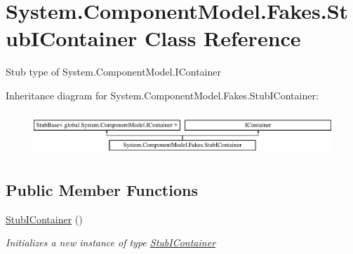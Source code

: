 \hypertarget{class_system_1_1_component_model_1_1_fakes_1_1_stub_i_container}{\section{System.\-Component\-Model.\-Fakes.\-Stub\-I\-Container Class Reference}
\label{class_system_1_1_component_model_1_1_fakes_1_1_stub_i_container}
}


Stub type of System.\-Component\-Model.\-I\-Container 


Inheritance diagram for System.\-Component\-Model.\-Fakes.\-Stub\-I\-Container\-:\begin{figure}[H]
\begin{center}
\leavevmode
\includegraphics[height=1.651917cm]{class_system_1_1_component_model_1_1_fakes_1_1_stub_i_container}
\end{center}
\end{figure}
\subsection*{Public Member Functions}
\begin{DoxyCompactItemize}
\item 
\hyperlink{class_system_1_1_component_model_1_1_fakes_1_1_stub_i_container_a915133143428d4e1a2e130e4c6b168ab}{Stub\-I\-Container} ()
\begin{DoxyCompactList}\small\item\em Initializes a new instance of type \hyperlink{class_system_1_1_component_model_1_1_fakes_1_1_stub_i_container}{Stub\-I\-Container}\end{DoxyCompactList}\end{DoxyCompactItemize}
